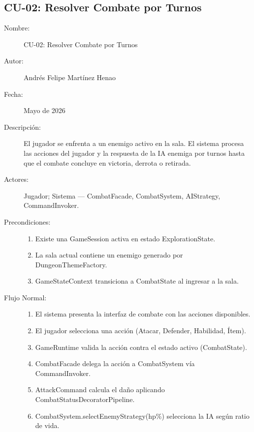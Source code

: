 \documentclass[stu,12pt,floatsintext]{apa7}
\begin{document}

\subsection{CU-02: Resolver Combate por Turnos}

\begin{description}
    \item[Nombre:] CU-02: Resolver Combate por Turnos
    \item[Autor:] Andrés Felipe Martínez Henao
    \item[Fecha:] Mayo de 2026
    \item[Descripción:] El jugador se enfrenta a un enemigo activo en la sala. El sistema procesa las acciones del jugador y la respuesta de la IA enemiga por turnos hasta que el combate concluye en victoria, derrota o retirada.
    \item[Actores:] Jugador; Sistema — CombatFacade, CombatSystem, AIStrategy, CommandInvoker.
    \item[Precondiciones:] \hfill
        \begin{enumerate}[label=\arabic*.]
            \item Existe una GameSession activa en estado ExplorationState.
            \item La sala actual contiene un enemigo generado por DungeonThemeFactory.
            \item GameStateContext transiciona a CombatState al ingresar a la sala.
        \end{enumerate}
    \item[Flujo Normal:] \hfill
        \begin{enumerate}[label=\arabic*.]
            \item El sistema presenta la interfaz de combate con las acciones disponibles.
            \item El jugador selecciona una acción (Atacar, Defender, Habilidad, Ítem).
            \item GameRuntime valida la acción contra el estado activo (CombatState).
            \item CombatFacade delega la acción a CombatSystem vía CommandInvoker.
            \item AttackCommand calcula el daño aplicando CombatStatusDecoratorPipeline.
            \item CombatSystem.selectEnemyStrategy(hp\%) selecciona la IA según ratio de vida.

\end{enumerate}
\end{description}
\end{document}
